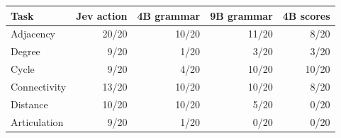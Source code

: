 \begin{tabular}{lrrrr}
\toprule
Task & Jev action & 4B grammar & 9B grammar & 4B scores \\
\midrule
Adjacency & 20/20 & 10/20 & 11/20 & 8/20 \\
Degree & 9/20 & 1/20 & 3/20 & 3/20 \\
Cycle & 9/20 & 4/20 & 10/20 & 10/20 \\
Connectivity & 13/20 & 10/20 & 10/20 & 8/20 \\
Distance & 10/20 & 10/20 & 5/20 & 0/20 \\
Articulation & 9/20 & 1/20 & 0/20 & 0/20 \\
\bottomrule
\end{tabular}
